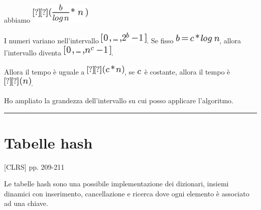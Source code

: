 \documentclass{article}
\begin{document}
{abbiamo }\includegraphics{images/image214.png}

{I numeri variano nell'intervallo
}\includegraphics{images/image215.png}{. Se fisso
}\includegraphics{images/image216.png}{, allora l'intervallo diventa
}\includegraphics{images/image217.png}{.}

{Allora il tempo è uguale a }\includegraphics{images/image218.png}{, se
}\includegraphics{images/image219.png}{~è costante, allora il tempo è
}\includegraphics{images/image149.png}{.}

{}

{Ho ampliato la grandezza dell'intervallo su cui posso applicare
l'algoritmo.}

\begin{center}\rule{0.5\linewidth}{\linethickness}\end{center}

\section{\texorpdfstring{{}}{}}\label{h.nfzrbduhc0fl}

\hypertarget{h.1gvh3qlqsocy}{\section{\texorpdfstring{{Tabelle
hash}}{Tabelle hash}}\label{h.1gvh3qlqsocy}}

{{[}CLRS{]} pp. 209-211}

{}

{Le tabelle hash sono una possibile implementazione dei dizionari,
insiemi dinamici con inserimento, cancellazione e ricerca dove ogni
elemento è associato ad una chiave.}
\end{document}
